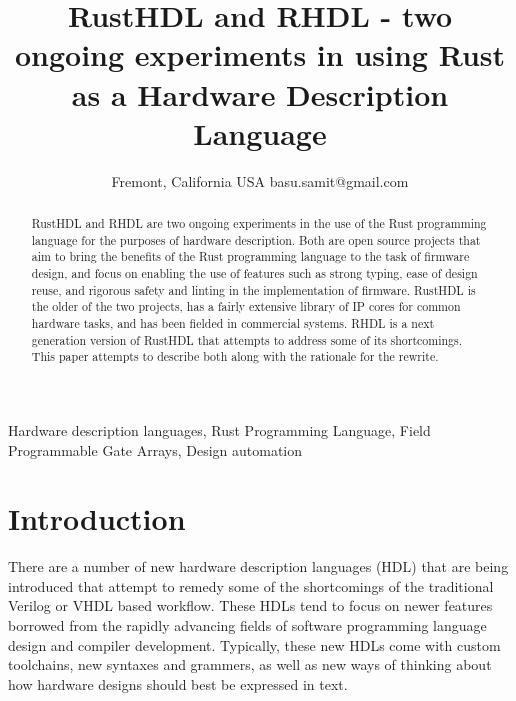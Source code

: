 \documentclass[conference]{IEEEtran}
\begin{document}
\title{RustHDL and RHDL - two ongoing experiments in using Rust as a Hardware Description Language}

\author{
  Fremont, California
  USA
  basu.samit@gmail.com
}

\maketitle

\begin{abstract}
  RustHDL and RHDL are two ongoing experiments in the use of the Rust programming language for the
  purposes of hardware description.  Both are open source projects that aim to bring the benefits
  of the Rust programming language to the task of firmware design, and focus on enabling the use
  of features such as strong typing, ease of design reuse, and rigorous safety and linting in
  the implementation of firmware.  RustHDL is the older of the two projects, has a fairly extensive
  library of IP cores for common hardware tasks, and has been fielded in commercial systems.
  RHDL is a next generation version of RustHDL that attempts to address some of its shortcomings.
  This paper attempts to describe both along with the rationale for the rewrite.
\end{abstract}

\begin{IEEEkeywords}
  Hardware description languages, Rust Programming Language, Field Programmable Gate Arrays,
  Design automation
\end{IEEEkeywords}



\section{Introduction}
There are a number of new hardware description languages (HDL) that are being introduced that
attempt to remedy some of the shortcomings of the traditional Verilog or VHDL based workflow.
These HDLs tend to focus on newer features borrowed from the rapidly advancing fields of
software programming language design and compiler development.  Typically, these new HDLs
come with custom toolchains, new syntaxes and grammers, as well as new ways of thinking about
how hardware designs should best be expressed in text.
\end{document}
